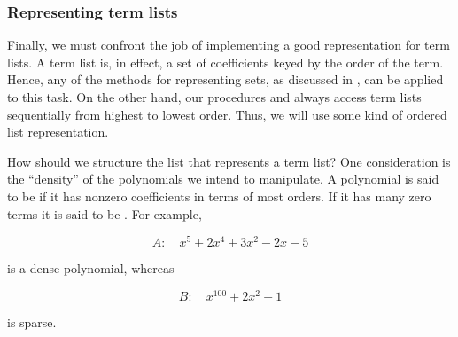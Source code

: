 \subsubsection*{Representing term lists}

Finally, we must confront the job of implementing a good representation for
term lists.  A term list is, in effect, a set of coefficients keyed by the
order of the term.  Hence, any of the methods for representing sets, as
discussed in , can be applied to this task.  On the other
hand, our procedures  and  always access term
lists sequentially from highest to lowest order.  Thus, we will use some kind
of ordered list representation.

How should we structure the list that represents a term list?  One
consideration is the ``density'' of the polynomials we intend to manipulate.  A
polynomial is said to be  if it has nonzero coefficients in
terms of most orders.  If it has many zero terms it is said to be
.  For example,

$$ A: \quad x^5 + 2x^4 + 3x^2 - 2x - 5 $$

\noindent
is a dense polynomial, whereas

$$ B: \quad x^{100} + 2x^2 + 1 $$

\noindent
is sparse.

